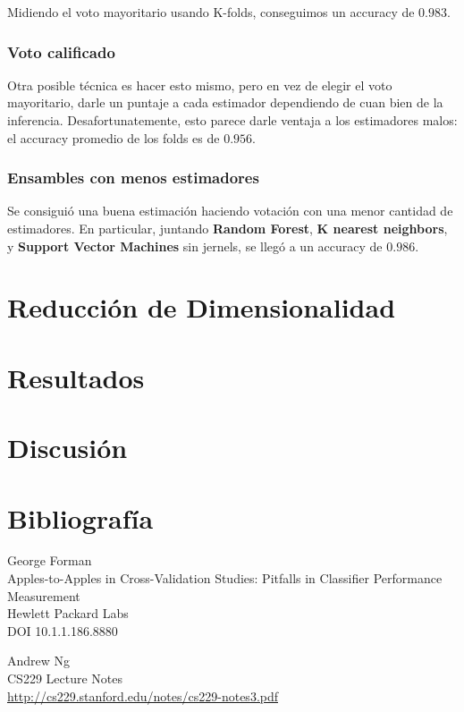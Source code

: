 \documentclass{article}
\begin{document}
Midiendo el voto mayoritario usando K-folds, conseguimos un accuracy de \( 0.983 \).

\subsubsection{Voto calificado}

Otra posible técnica es hacer esto mismo, pero en vez de elegir el voto mayoritario, darle un puntaje a cada estimador dependiendo de cuan bien de la inferencia. Desafortunatemente, esto parece darle ventaja a los estimadores malos: el accuracy promedio de los folds es de \( 0.956 \).

\subsubsection{Ensambles con menos estimadores}

Se consiguió una buena estimación haciendo votación con una menor cantidad de estimadores. En particular, juntando \textbf{Random Forest}, \textbf{K nearest neighbors}, y \textbf{Support Vector Machines} sin jernels, se llegó a un accuracy de \( 0.986 \).

\section{Reducción de Dimensionalidad}



\section{Resultados}

\section{Discusión}

\section{Bibliografía}

\begin{thebibliography}{9}

	George Forman \\
	Apples-to-Apples in Cross-Validation Studies: Pitfalls in Classifier Performance Measurement \\
	Hewlett Packard Labs \\
	DOI 10.1.1.186.8880

    Andrew Ng \\
	CS229 Lecture Notes \\
	\url{http://cs229.stanford.edu/notes/cs229-notes3.pdf}

\end{thebibliography}
\end{document}
